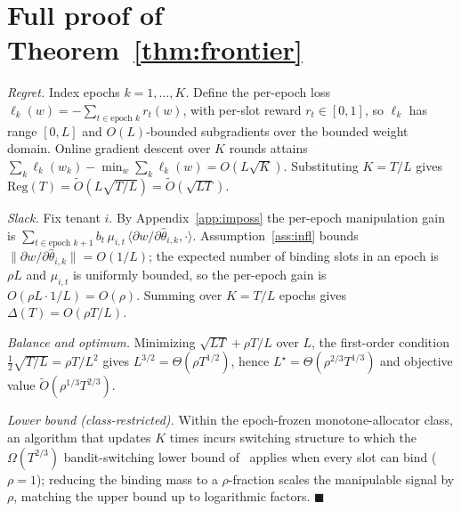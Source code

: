 \documentclass[conference]{IEEEtran}
\theoremstyle{definition}
\theoremstyle{remark}
\newcommand{\Slots}{T}
\newcommand{\Ep}{L}
\newcommand{\Neps}{K}
\newcommand{\rhobind}{\rho}
\newcommand{\type}{\theta}
\newcommand{\wt}{w}
\newcommand{\bindind}{b}
\newcommand{\Reg}{\mathrm{Reg}}
\newcommand{\Slack}{\Delta}
\newcommand{\Otil}{\tilde{O}}
\begin{document}
\section{Full proof of Theorem~\ref{thm:frontier}}\label{app:frontier}
\emph{Regret.} Index epochs $k=1,\dots,\Neps$. Define the per-epoch loss $\ell_k(\wt)=-\sum_{t\in\text{epoch }k}r_t(\wt)$, with per-slot reward $r_t\in[0,1]$, so $\ell_k$ has range $[0,\Ep]$ and $O(\Ep)$-bounded subgradients over the bounded weight domain. Online gradient descent over $\Neps$ rounds attains $\sum_k\ell_k(\wt_k)-\min_{\wt}\sum_k\ell_k(\wt)=O(\Ep\sqrt{\Neps})$. Substituting $\Neps=\Slots/\Ep$ gives $\Reg(\Slots)=\Otil(\Ep\sqrt{\Slots/\Ep})=\Otil(\sqrt{\Ep\Slots})$.

\emph{Slack.} Fix tenant $i$. By Appendix~\ref{app:imposs} the per-epoch manipulation gain is $\sum_{t\in\text{epoch }k+1}\bindind_t\,\mu_{i,t}\,\langle\partial\wt/\partial\hat\type_{i,k},\cdot\rangle$. Assumption~\ref{ass:infl} bounds $\lVert\partial\wt/\partial\hat\type_{i,k}\rVert=O(1/\Ep)$; the expected number of binding slots in an epoch is $\rhobind\Ep$ and $\mu_{i,t}$ is uniformly bounded, so the per-epoch gain is $O(\rhobind\Ep\cdot1/\Ep)=O(\rhobind)$. Summing over $\Neps=\Slots/\Ep$ epochs gives $\Slack(\Slots)=O(\rhobind\Slots/\Ep)$.

\emph{Balance and optimum.} Minimizing $\sqrt{\Ep\Slots}+\rhobind\Slots/\Ep$ over $\Ep$, the first-order condition $\tfrac12\sqrt{\Slots/\Ep}=\rhobind\Slots/\Ep^{2}$ gives $\Ep^{3/2}=\Theta(\rhobind\Slots^{1/2})$, hence $\Ep^\star=\Theta(\rhobind^{2/3}\Slots^{1/3})$ and objective value $\Otil(\rhobind^{1/3}\Slots^{2/3})$.

\emph{Lower bound (class-restricted).} Within the epoch-frozen monotone-allocator class, an algorithm that updates $\Neps$ times incurs switching structure to which the $\Omega(\Slots^{2/3})$ bandit-switching lower bound of~\cite{ref:dekel} applies when every slot can bind ($\rhobind=1$); reducing the binding mass to a $\rhobind$-fraction scales the manipulable signal by $\rhobind$, matching the upper bound up to logarithmic factors. \hfill$\blacksquare$
\end{document}

